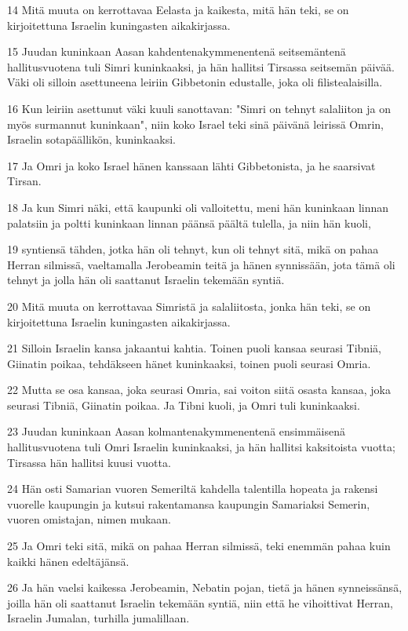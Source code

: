 \par 14 Mitä muuta on kerrottavaa Eelasta ja kaikesta, mitä hän teki, se on kirjoitettuna Israelin kuningasten aikakirjassa.
\par 15 Juudan kuninkaan Aasan kahdentenakymmenentenä seitsemäntenä hallitusvuotena tuli Simri kuninkaaksi, ja hän hallitsi Tirsassa seitsemän päivää. Väki oli silloin asettuneena leiriin Gibbetonin edustalle, joka oli filistealaisilla.
\par 16 Kun leiriin asettunut väki kuuli sanottavan: "Simri on tehnyt salaliiton ja on myös surmannut kuninkaan", niin koko Israel teki sinä päivänä leirissä Omrin, Israelin sotapäällikön, kuninkaaksi.
\par 17 Ja Omri ja koko Israel hänen kanssaan lähti Gibbetonista, ja he saarsivat Tirsan.
\par 18 Ja kun Simri näki, että kaupunki oli valloitettu, meni hän kuninkaan linnan palatsiin ja poltti kuninkaan linnan päänsä päältä tulella, ja niin hän kuoli,
\par 19 syntiensä tähden, jotka hän oli tehnyt, kun oli tehnyt sitä, mikä on pahaa Herran silmissä, vaeltamalla Jerobeamin teitä ja hänen synnissään, jota tämä oli tehnyt ja jolla hän oli saattanut Israelin tekemään syntiä.
\par 20 Mitä muuta on kerrottavaa Simristä ja salaliitosta, jonka hän teki, se on kirjoitettuna Israelin kuningasten aikakirjassa.
\par 21 Silloin Israelin kansa jakaantui kahtia. Toinen puoli kansaa seurasi Tibniä, Giinatin poikaa, tehdäkseen hänet kuninkaaksi, toinen puoli seurasi Omria.
\par 22 Mutta se osa kansaa, joka seurasi Omria, sai voiton siitä osasta kansaa, joka seurasi Tibniä, Giinatin poikaa. Ja Tibni kuoli, ja Omri tuli kuninkaaksi.
\par 23 Juudan kuninkaan Aasan kolmantenakymmenentenä ensimmäisenä hallitusvuotena tuli Omri Israelin kuninkaaksi, ja hän hallitsi kaksitoista vuotta; Tirsassa hän hallitsi kuusi vuotta.
\par 24 Hän osti Samarian vuoren Semeriltä kahdella talentilla hopeata ja rakensi vuorelle kaupungin ja kutsui rakentamansa kaupungin Samariaksi Semerin, vuoren omistajan, nimen mukaan.
\par 25 Ja Omri teki sitä, mikä on pahaa Herran silmissä, teki enemmän pahaa kuin kaikki hänen edeltäjänsä.
\par 26 Ja hän vaelsi kaikessa Jerobeamin, Nebatin pojan, tietä ja hänen synneissänsä, joilla hän oli saattanut Israelin tekemään syntiä, niin että he vihoittivat Herran, Israelin Jumalan, turhilla jumalillaan.
